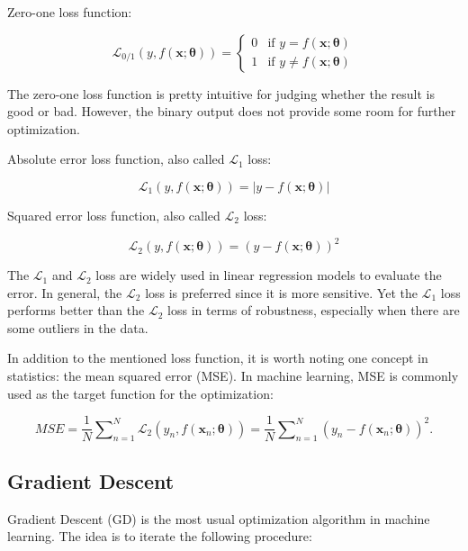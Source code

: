\documentclass[
	parskip, 			   %
	twoside, 			   %
	DIV=14, 			   %
	BCOR=15.0mm, 		   %
	headsepline, 		   %
	open=right, 		   %
	captions=tableheading, %
	bibliography=totoc,    %
	numbers=noenddot       %
]{scrreprt}
\begin{document}
Zero-one loss function:

\begin{equation}
    \label{eq:zero_one_loss}
    \mathcal{L}_{0/1}\left( y,f \left(\mathbf{x};\mathbf{\theta} \right) \right) = \begin{cases} 0 & \text{if } y=f(\mathbf{x};\mathbf{\theta}) \\ 1 & \text{if } y \neq f(\mathbf{x};\mathbf{\theta})
    \end{cases}
\end{equation}

The zero-one loss function is pretty intuitive for judging whether the result is good or bad. However, the binary output does not provide some room for further optimization.

Absolute error loss function, also called $\mathcal{L}_{1}$ loss:

\begin{equation}
    \label{eq:AE_loss}
    \mathcal{L}_{1}\left( y,f(\mathbf{x};\mathbf{\theta}) \right) = |y-f(\mathbf{x};\mathbf{\theta})|
\end{equation}

Squared error loss function, also called $\mathcal{L}_{2}$ loss:

\begin{equation}
    \label{eq:SE_loss}
    \mathcal{L}_{2}\left( y,f(\mathbf{x};\mathbf{\theta}) \right) = (y-f(\mathbf{x};\mathbf{\theta}))^2
\end{equation}

The $\mathcal{L}_{1}$ and $\mathcal{L}_{2}$ loss are widely used in linear regression models to evaluate the error. In general, the $\mathcal{L}_{2}$ loss is preferred since it is more sensitive. Yet the $\mathcal{L}_{1}$ loss performs better than the $\mathcal{L}_{2}$ loss in terms of robustness, especially when there are some outliers in the data.

In addition to the mentioned loss function, it is worth noting one concept in statistics: the mean squared error (MSE). In machine learning, MSE is commonly used as the target function for the optimization:

\begin{equation}
    \label{eq:MSE}
    MSE = \frac{1}{N} \sum\nolimits_{n=1}^N \mathcal{L}_{2}\left( y_n,f(\mathbf{x}_n;\mathbf{\theta}) \right) = \frac{1}{N} \sum\nolimits_{n=1}^N (y_n-f(\mathbf{x}_n;\mathbf{\theta}))^2.
\end{equation}


\subsection{Gradient Descent}
Gradient Descent (GD) is the most usual optimization algorithm in machine learning. The idea is to iterate the following procedure:
\end{document}

